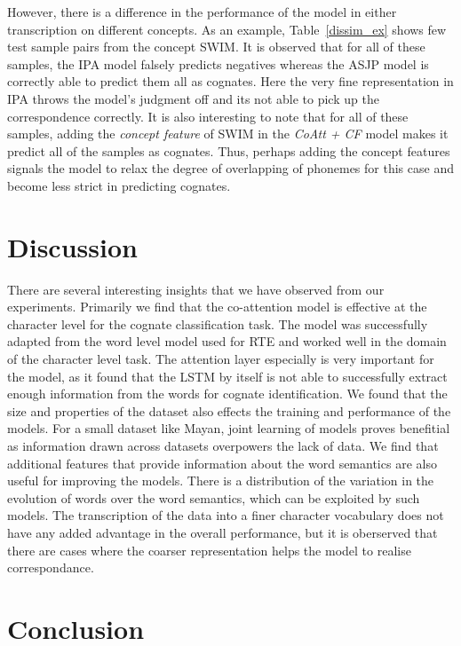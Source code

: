 \documentclass[11pt,letterpaper]{article}
\begin{document}
However, there is a difference in the performance of the model in either transcription on different concepts. As an example, Table~\ref{dissim_ex} shows few test sample pairs from the concept SWIM. It is observed that for all of these samples, the IPA model falsely predicts negatives whereas the ASJP model is correctly able to predict them all as cognates. Here the very fine representation in IPA throws the model's judgment off and its not able to pick up the correspondence correctly. It is also interesting to note that for all of these samples, adding the \textit{concept feature} of SWIM in the \textit{CoAtt + CF} model makes it predict all of the samples as cognates. Thus, perhaps adding the concept features signals the model to relax the degree of overlapping of phonemes for this case and become less strict in predicting cognates.

\section{Discussion}

There are several interesting insights that we have observed from our experiments. Primarily we find that the co-attention model is effective at the character level for the cognate classification task. The model was successfully adapted from the word level model used for RTE and worked well in the domain of the character level task. The attention layer especially is very important for the model, as it found that the LSTM by itself is not able to successfully extract enough information from the words for cognate identification. We found that the size and properties of the dataset also effects the training and performance of the models. For a small dataset like Mayan, joint learning of models proves benefitial as information drawn across datasets overpowers the lack of data. We find that additional features that provide information about the word semantics are also useful for improving the models. There is a distribution of the variation in the evolution of words over the word semantics, which can be exploited by such models. The transcription of the data into a finer character vocabulary does not have any added advantage in the overall performance, but it is oberserved that there are cases where the coarser representation helps the model to realise correspondance.

\section{Conclusion}
\end{document}
